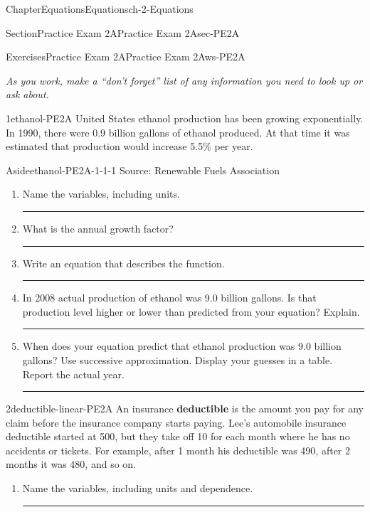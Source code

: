 \documentclass[twoside,11pt,]{book}
\newcommand{\terminology}[1]{\textbf{#1}}
\newlength{\workspacestrutwidth}
\numberwithin{equation}{section}
\begin{document}
\begin{chapterptx}{Chapter}{Equations}{}{Equations}{}{}{ch-2-Equations}
\begin{sectionptx}{Section}{Practice Exam 2A}{}{Practice Exam 2A}{}{}{sec-PE2A}
\begin{exercises-subsection-numberless}{Exercises}{Practice Exam 2A}{}{Practice Exam 2A}{}{}{ws-PE2A}
\begin{introduction}{}
\emph{As you work, make a ``don't forget'' list of any information you need to look up or ask about.}%
\end{introduction}%
\begin{divisionexercise}{1}{}{}{ethanol-PE2A}%
United States ethanol production has been growing exponentially. In 1990, there were 0.9 billion gallons of ethanol produced. At that time it was estimated that production would increase 5.5\% per year. \begin{aside}{Aside}{}{ethanol-PE2A-1-1-1}%
Source: Renewable Fuels Association%
\end{aside}
%
\begin{enumerate}[label=(\alph*),ref=\alph*]%
\item{}Name the variables, including units.%
\par\rule{\workspacestrutwidth}{0.5in}%
\item{}What is the annual growth factor?%
\par\rule{\workspacestrutwidth}{0.5in}%
\item{}Write an equation that describes the function.%
\par\rule{\workspacestrutwidth}{0.5in}%
\item{}In 2008 actual production of ethanol was 9.0 billion gallons. Is that production level higher or lower than predicted from your equation? Explain.%
\par\rule{\workspacestrutwidth}{0.5in}%
\item{}When does your equation predict that ethanol production was 9.0 billion gallons? Use successive approximation. Display your guesses in a table. Report the actual year.%
\par\rule{\workspacestrutwidth}{0.5in}%
\end{enumerate}%
\end{divisionexercise}%
\clearpage
\begin{divisionexercise}{2}{}{}{deductible-linear-PE2A}%
An insurance \terminology{deductible} is the amount you pay for any claim before the insurance company starts paying. Lee's automobile insurance deductible started at \textdollar{}500, but they take off \textdollar{}10 for each month where he has no accidents or tickets. For example, after 1 month his deductible was \textdollar{}490, after 2 months it was \textdollar{}480, and so on.%
\begin{enumerate}[label=(\alph*),ref=\alph*]%
\item{}Name the variables, including units and dependence.%
\par\rule{\workspacestrutwidth}{0.9in}%

\end{enumerate}
\end{divisionexercise}
\end{exercises-subsection-numberless}
\end{sectionptx}
\end{chapterptx}
\end{document}
